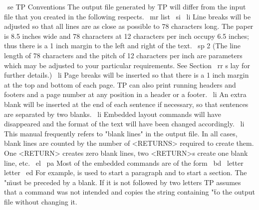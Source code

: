 ~se TP Conventions
The output file generated by TP will differ from the input file that you
created in the following respects.
~mr list
~si
~li Line breaks will be adjusted so that all lines are as close as
possible to 78 characters long.
The paper is 8.5 inches wide and 78 characters at 12 characters per inch
occupy 6.5 inches; thus there is a 1 inch margin to the left and right
of the text.
~sp 2
(The line length of 78 characters and the pitch of 12 characters per
inch are parameters which may be adjusted to your particular
requirements. 
See Section ~rr s lay for further details.)
~li Page breaks will be inserted so that there is a 1 inch margin at
the top and bottom of each page.
TP can also print running headers and footers
and a page number at any position in a header or a footer. 
~li An extra blank will be inserted at the end of each sentence if necessary,
so that sentences are separated by two blanks.
~li Embedded layout commands will have disappeared and the format of the
text will have been changed accordingly.
~li This manual frequently refers to "blank lines" in the output file.
In all cases, blank lines are counted by the number of <RETURNS> required
to create them.
One <RETURN> creates zero blank lines, two <RETURN>s create one blank line,
etc.
~el
~pa Most of the embedded commands are of the form
~bd \ letter letter ~ed
For example, \PA is used to start a paragraph and \SE to start a
section.
The "\" must be preceded by a blank.
If it is not followed by two letters TP assumes that a command was not
intended and copies the string containing "\" to the output file without
changing it.


